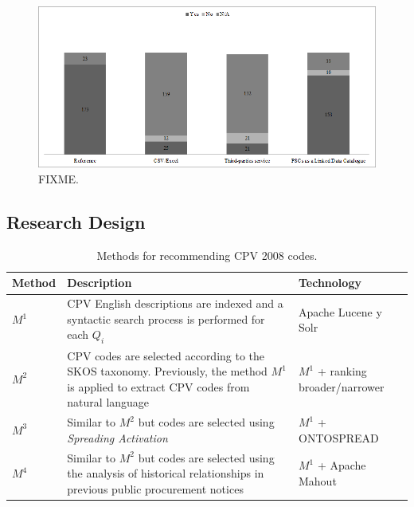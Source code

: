  \begin{figure}[!ht]
\centering
	\includegraphics[width=\textwidth]{./imgs/fig-4}
 \caption{FIXME.}
 \label{fig:results-4}
\end{figure}



\subsection{Research Design}


\begin{table}[!htb]
\renewcommand{\arraystretch}{1.3}
\begin{center}
\begin{tabular}[c]{|l|p{8.5cm}|p{4.5cm}|} 
\hline
\textbf{Method} &  \textbf{Description} &  \textbf{Technology} \\\hline
$M^1$ & CPV English descriptions are indexed and a syntactic search process is performed for each $Q_i$ & Apache Lucene y Solr \\ \hline
$M^2$ & CPV codes are selected according to the SKOS taxonomy. Previously, the method $M^1$ is applied to extract CPV codes from natural language & $M^1$ + ranking broader/narrower \\ \hline
$M^3$ & Similar to $M^2$ but codes are selected using \textit{Spreading Activation}& $M^1$ + ONTOSPREAD \\ \hline
$M^4$ & Similar to $M^2$ but codes are selected using the analysis of historical relationships in previous public procurement notices & $M^1$ + Apache Mahout \\ \hline
 \end{tabular}
  \caption{Methods for recommending CPV 2008 codes.}\label{methods-recommending}  
    \end{center}
\end{table}


